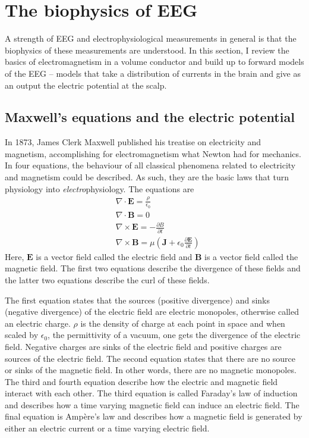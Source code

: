 \section{The biophysics of EEG} \label{sec:EM_theory}

A strength of EEG and electrophysiological measurements in general is that the biophysics of these measurements are understood. In this section, I review the basics of electromagnetism in a volume conductor and build up to forward models of the EEG -- models that take a distribution of currents in the brain and give as an output the electric potential at the scalp.

\subsection{Maxwell's equations and the electric potential}
In 1873, James Clerk Maxwell published his treatise on electricity and magnetism, accomplishing for electromagnetism what Newton had for mechanics. In four equations, the behaviour of all classical phenomena related to electricity and magnetism could be described. As such, they are the basic laws that turn physiology into \textit{electro}physiology. The equations are
\begin{align*}
    & \nabla \cdot \bm{E} = \frac{\rho}{\epsilon_0} \\
    & \nabla \cdot \bm{B} = 0 \\
    & \nabla \times \bm{E} = - \frac{\partial {B}}{\partial t} \\
    & \nabla \times \bm{B} = \mu \left( \bm{J} + \epsilon_0 \frac{\partial \bm{E}}{\partial t} \right)
\end{align*}
Here, $\bm{E}$ is a vector field called the electric field and $\bm{B}$ is a vector field called the magnetic field. The first two equations describe the divergence of these fields and the latter two equations describe the curl of these fields. 

The first equation states that the sources (positive divergence) and sinks (negative divergence) of the electric field are electric monopoles, otherwise called an electric charge. $\rho$ is the density of charge at each point in space and when scaled by $\epsilon_0$, the permittivity of a vacuum, one gets the divergence of the electric field. Negative charges are sinks of the electric field and positive charges are sources of the electric field. The second equation states that there are no source or sinks of the magnetic field. In other words, there are no magnetic monopoles. The third and fourth equation describe how the electric and magnetic field interact with each other. The third equation is called Faraday's law of induction and describes how a time varying magnetic field can induce an electric field. The final equation is Ampère's law and describes how a magnetic field is generated by either an electric current or a time varying electric field.

